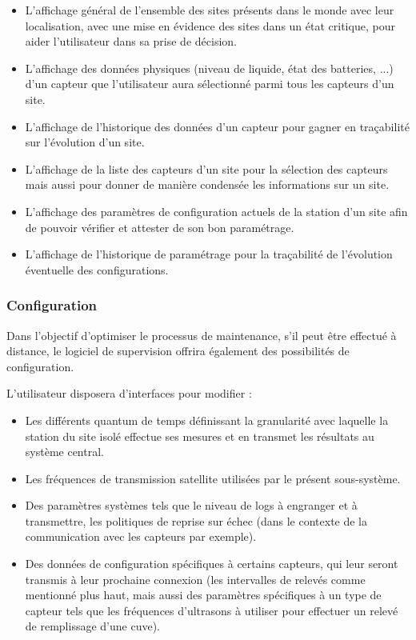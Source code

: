 \begin{itemize}
	\item L'affichage général de l'ensemble des sites présents dans le monde avec leur localisation, avec une mise en évidence des sites dans un état critique, pour aider l'utilisateur dans sa prise de décision.
	\item L'affichage des données physiques (niveau de liquide, état des batteries, ...) d'un capteur que l'utilisateur aura sélectionné parmi tous les capteurs d'un site.
	\item L'affichage de l'historique des données d'un capteur pour gagner en traçabilité sur l'évolution d'un site.
	\item L'affichage de la liste des capteurs d'un site pour la sélection des capteurs mais aussi pour donner de manière condensée les informations sur un site.
	\item L'affichage des paramètres de configuration actuels de la station d'un site afin de pouvoir vérifier et attester de son bon paramétrage.
	\item L'affichage de l'historique de paramétrage pour la traçabilité de l'évolution éventuelle des configurations.
\end{itemize}

\subsubsection{Configuration}

Dans l'objectif d'optimiser le processus de maintenance, s'il peut être effectué à distance, le logiciel de supervision offrira également des possibilités de configuration.

L'utilisateur disposera d'interfaces pour modifier :

\begin{itemize}
	\item Les différents quantum de temps définissant la granularité avec laquelle la station du site isolé effectue ses mesures et en transmet les résultats au système central.
	\item Les fréquences de transmission satellite utilisées par le présent sous-système.
	\item Des paramètres systèmes tels que le niveau de logs à engranger et à transmettre, les politiques de reprise sur échec (dans le contexte de la communication avec les capteurs par exemple).
	\item Des données de configuration spécifiques à certains capteurs, qui leur seront transmis à leur prochaine connexion (les intervalles de relevés comme mentionné plus haut, mais aussi des paramètres spécifiques à un type de capteur tels que les fréquences d'ultrasons à utiliser pour effectuer un relevé de remplissage d'une cuve).
\end{itemize}

